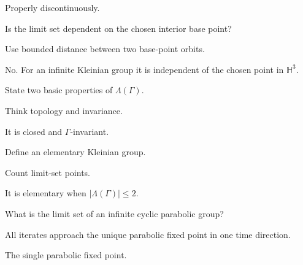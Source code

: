 \begin{solution}
Properly discontinuously.
\end{solution}

\begin{exercise}\label{exr:vii37-06}
Is the limit set dependent on the chosen interior base point?
\end{exercise}

\begin{hint}
Use bounded distance between two base-point orbits.
\end{hint}

\begin{solution}
No. For an infinite Kleinian group it is independent of the chosen point in \(\mathbb H^3\).
\end{solution}

\begin{exercise}\label{exr:vii37-07}
State two basic properties of \(\Lambda(\Gamma)\).
\end{exercise}

\begin{hint}
Think topology and invariance.
\end{hint}

\begin{solution}
It is closed and \(\Gamma\)-invariant.
\end{solution}

\begin{exercise}\label{exr:vii37-08}
Define an elementary Kleinian group.
\end{exercise}

\begin{hint}
Count limit-set points.
\end{hint}

\begin{solution}
It is elementary when \(|\Lambda(\Gamma)|\le2\).
\end{solution}

\begin{exercise}\label{exr:vii37-09}
What is the limit set of an infinite cyclic parabolic group?
\end{exercise}

\begin{hint}
All iterates approach the unique parabolic fixed point in one time direction.
\end{hint}

\begin{solution}
The single parabolic fixed point.
\end{solution}


